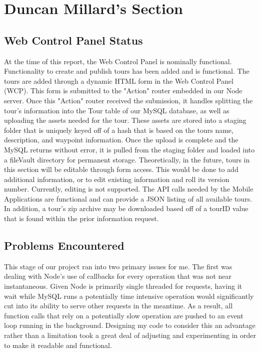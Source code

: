 \documentclass[letterpaper, 10pt,titlepage]{article}
\begin{document}
\vspace{0.5cm}

\section{Duncan Millard's Section}

\subsection{Web Control Panel Status}

At the time of this report, the Web Control Panel is nominally functional. Functionality to create and publish tours has been added and is functional. The tours are added through a dynamic HTML form in the Web Control Panel (WCP). This form is submitted to the "Action" router embedded in our Node server. Once this "Action" router received the submission, it handles splitting the tour's information into the Tour table of our MySQL database, as well as uploading the assets needed for the tour. These assets are stored into a staging folder that is uniquely keyed off of a hash that is based on the tours name, description, and waypoint information. Once the upload is complete and the MySQL returns without error, it is pulled from the staging folder and loaded into a fileVault directory for permanent storage. Theoretically, in the future, tours in this section will be editable through form access. This would be done to add additional information, or to edit existing information and roll its version number. Currently, editing is not supported. The API calls needed by the Mobile Applications are functional and can provide a JSON listing of all available tours. In addition, a tour's zip archive may be downloaded based off of a tourID value that is found within the prior information request.

\subsection{Problems Encountered}

This stage of our project ran into two primary issues for me. The first was dealing with Node's use of callbacks for every operation that was not near instantaneous. Given Node is primarily single threaded for requests, having it wait while MySQL runs a potentially time intensive operation would significantly cut into its ability to serve other requests in the meantime. As a result, all function calls that rely on a potentially slow operation are pushed to an event loop running in the background. Designing my code to consider this an advantage rather than a limitation took a great deal of adjusting and experimenting in order to make it readable and functional.
\end{document}
